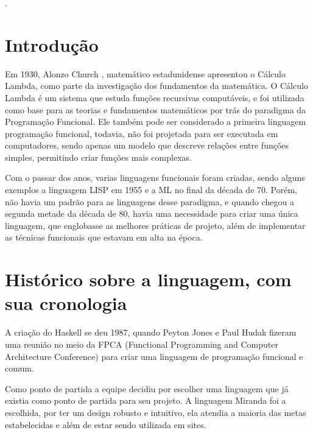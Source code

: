 \documentclass[
  article,			       %
  12pt,				         %
  oneside,			       %
  a4paper,			       %
  english,		       	 %
  brazil,			      	 %
  sumario=tradicional
]{abntex2}
\begin{document}
 

    \renewcommand{\thesection}{\noindent\arabic{chapter}.\arabic{section}}. 
    \frenchspacing
    \imprimircapa
    \tableofcontents*
    \cleardoublepage
    \textual
    \newpage
    \chapter{Introdução}

    Em 1930, Alonzo Church , matemático estadunidense apresentou o Cálculo Lambda, como parte da investigação dos fundamentos da matemática. O Cálculo Lambda é um sistema que
    estuda funções recursivas computáveis, e foi utilizada como base para as teorias e fundamentos matemáticos por trás do paradigma da Programação Funcional. Ele também
    pode ser considerado a primeira linguagem programação funcional, todavia, não foi projetada para ser executada em computadores, sendo apenas um modelo que descreve relações entre funções
    simples, permitindo criar funções mais complexas.

    Com o passar dos anos, varias linguagens funcionais foram criadas, sendo alguns exemplos a linguagem LISP em 1955 e a ML no final da década de 70. Porém, não
    havia um padrão para as linguagens desse paradigma, e quando chegou a segunda metade da década de 80, havia uma necessidade para criar uma única linguagem, que englobasse
    as melhores práticas de projeto, além de implementar as técnicas funcionais que estavam em alta na época.


    \newpage
    \chapter{Histórico sobre a linguagem, com sua cronologia}

    A criação do Haskell se deu 1987, quando Peyton Jones e Paul Hudak fizeram uma reunião no meio da FPCA (Functional  Programming and Computer Architecture Conference)
    para criar uma linguagem de programação funcional e comum. 
    
    Como ponto de partida a equipe decidiu por escolher uma linguagem que já existia como ponto de partida para seu projeto.
    A linguagem Miranda foi a escolhida, por ter um design robusto e intuitivo, ela atendia a maioria das metas estabelecidas e 
    além de estar sendo utilizada em sites. 
\end{document}
